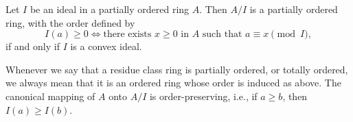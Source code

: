 Let $I$ be an ideal in a partially ordered ring $A$. Then $A/I$ is a partially ordered ring, with the order defined by
$$
I(a) \geq 0 \iff \text{there exists } x \geq 0 \text{ in } A \text{ such that } a \equiv x \pmod{I},
$$
if and only if $I$ is a convex ideal.

Whenever we say that a residue class ring is partially ordered, or totally ordered, we always mean that it is an ordered ring whose order is induced as above. The canonical mapping of $A$ onto $A/I$ is order-preserving, i.e., if $a \geq b$, then $I(a) \geq I(b)$.
